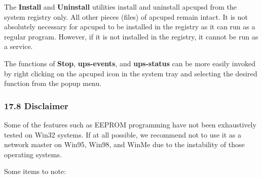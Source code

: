 The {\bf Install} and {\bf Uninstall} utilities install and uninstall apcupsd
from the system registry only. All other pieces (files) of apcupsd remain
intact. It is not absolutely necessary for apcupsd to be installed in the
registry as it can run as a regular program. However, if it is not installed
in the registry, it cannot be run as a service.  

The functions of {\bf Stop}, {\bf ups-events}, and {\bf ups-status} can be
more easily invoked by right clicking on the apcupsd icon in the system tray
and selecting the desired function from the popup menu. 

\label{Disclaimer}

\subsubsection*{17.8 Disclaimer}

\label{index-Disclaimer-180}
Some of the features such as EEPROM programming have not been exhaustively
tested on Win32 systems. If at all possible, we recommend not to use it as a
network master on Win95, Win98, and WinMe due to the instability of those
operating systems.  

Some items to note:  

